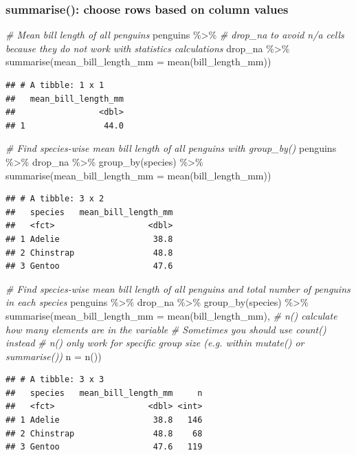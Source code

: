 \documentclass[
]{article}
\newenvironment{Shaded}{\begin{snugshade}}{\end{snugshade}}
\newcommand{\AttributeTok}[1]{\textcolor[rgb]{0.77,0.63,0.00}{#1}}
\newcommand{\CommentTok}[1]{\textcolor[rgb]{0.56,0.35,0.01}{\textit{#1}}}
\newcommand{\FunctionTok}[1]{\textcolor[rgb]{0.00,0.00,0.00}{#1}}
\newcommand{\NormalTok}[1]{#1}
\newcommand{\SpecialCharTok}[1]{\textcolor[rgb]{0.00,0.00,0.00}{#1}}
\begin{document}
\hypertarget{summarise-choose-rows-based-on-column-values}{%
\subsubsection{summarise(): choose rows based on column
values}\label{summarise-choose-rows-based-on-column-values}}

\begin{Shaded}
\begin{Highlighting}[]
\CommentTok{\# Mean bill length of all penguins}
\NormalTok{penguins }\SpecialCharTok{\%\textgreater{}\%} 
\CommentTok{\# drop\_na to avoid n/a cells because they do not work with statistics calculations  }
\NormalTok{  drop\_na }\SpecialCharTok{\%\textgreater{}\%} 
  \FunctionTok{summarise}\NormalTok{(}\AttributeTok{mean\_bill\_length\_mm =} \FunctionTok{mean}\NormalTok{(bill\_length\_mm))}
\end{Highlighting}
\end{Shaded}

\begin{verbatim}
## # A tibble: 1 x 1
##   mean_bill_length_mm
##                 <dbl>
## 1                44.0
\end{verbatim}

\begin{Shaded}
\begin{Highlighting}[]
\CommentTok{\# Find species{-}wise mean bill length of all penguins with group\_by()}
\NormalTok{penguins }\SpecialCharTok{\%\textgreater{}\%} 
\NormalTok{  drop\_na }\SpecialCharTok{\%\textgreater{}\%} 
  \FunctionTok{group\_by}\NormalTok{(species) }\SpecialCharTok{\%\textgreater{}\%} 
  \FunctionTok{summarise}\NormalTok{(}\AttributeTok{mean\_bill\_length\_mm =} \FunctionTok{mean}\NormalTok{(bill\_length\_mm))}
\end{Highlighting}
\end{Shaded}

\begin{verbatim}
## # A tibble: 3 x 2
##   species   mean_bill_length_mm
##   <fct>                   <dbl>
## 1 Adelie                   38.8
## 2 Chinstrap                48.8
## 3 Gentoo                   47.6
\end{verbatim}

\begin{Shaded}
\begin{Highlighting}[]
\CommentTok{\# Find species{-}wise mean bill length of all penguins and total number of penguins in each species}
\NormalTok{penguins }\SpecialCharTok{\%\textgreater{}\%} 
\NormalTok{  drop\_na }\SpecialCharTok{\%\textgreater{}\%} 
  \FunctionTok{group\_by}\NormalTok{(species) }\SpecialCharTok{\%\textgreater{}\%} 
  \FunctionTok{summarise}\NormalTok{(}\AttributeTok{mean\_bill\_length\_mm =} \FunctionTok{mean}\NormalTok{(bill\_length\_mm), }
\CommentTok{\# n() calculate how many elements are in the variable        }
\CommentTok{\# Sometimes you should use count() instead}
\CommentTok{\# n() only work for specific group size (e.g. within mutate() or summarise())}
            \AttributeTok{n =} \FunctionTok{n}\NormalTok{())}
\end{Highlighting}
\end{Shaded}

\begin{verbatim}
## # A tibble: 3 x 3
##   species   mean_bill_length_mm     n
##   <fct>                   <dbl> <int>
## 1 Adelie                   38.8   146
## 2 Chinstrap                48.8    68
## 3 Gentoo                   47.6   119
\end{verbatim}
\end{document}
